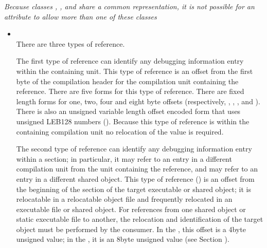 \textit{Because classes , 
, 
 and 
share a common representation, it is not possible for an
attribute to allow more than one of these classes}


\begin{itemize}
\item {} \\
There are three types of reference.

The 
first type of reference can identify any debugging
information entry within the containing unit. 
This type of
reference is an 
offset from the first byte of the compilation
header for the compilation unit containing the reference. There
are five forms for this type of reference. There are fixed
length forms for one, two, four and eight byte offsets
(respectively, , 
, 
,
and ). 
There is also an unsigned variable
length offset encoded form that uses unsigned LEB128 numbers
(). 
Because this type of reference is within
the containing compilation unit no relocation of the value
is required.

The second type of reference can identify any debugging
information entry within a 
\dotdebuginfo{} section; in particular,
it may refer to an entry in a different compilation unit
from the unit containing the reference, and may refer to an
entry in a different shared object.  This type of reference
() 
is an offset from the beginning of the
\dotdebuginfo{} 
section of the target executable or shared object;
it is relocatable in a relocatable object file and frequently
relocated in an executable file or shared object. For
references from one shared object or static executable file
to another, the relocation and identification of the target
object must be performed by the consumer. In the 
\thirtytwobitdwarfformat, this offset is a 4\dash byte unsigned value; 
in the \sixtyfourbitdwarfformat, it is an 8\dash byte
unsigned value 
(see Section ).


\end{itemize}
